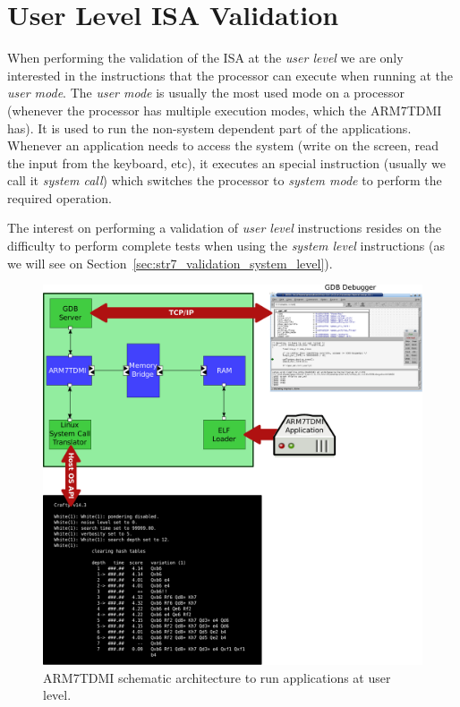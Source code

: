 \section{User Level ISA Validation}
\label{sec:str7_validation_user_level}

When performing the validation of the ISA at the \textit{user level} we are only interested in the instructions that the processor can execute when running at the \textit{user mode}.
The \textit{user mode} is usually the most used mode on a processor (whenever the processor has multiple execution modes, which the ARM7TDMI has).
It is used to run the non-system dependent part of the applications.
Whenever an application needs to access the system (write on the screen, read the input from the keyboard, etc), it executes an special instruction (usually we call it \textit{system call}) which switches the processor to \textit{system mode} to perform the required operation.

The interest on performing a validation of \textit{user level} instructions resides on the difficulty to perform complete tests when using the \textit{system level} instructions (as we will see on Section~\ref{sec:str7_validation_system_level}).

\begin{figure}[!h]
	\begin{center}
		\includegraphics[width=\textwidth]{str7_validation/figures/ARM7TDMI_user_level.pdf}
	\end{center}
	\caption{ARM7TDMI schematic architecture to run applications at user level.}
	\label{fig:str7_validation_user_level}
\end{figure}

